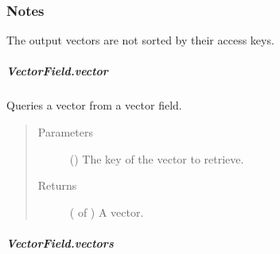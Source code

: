 \documentclass[letterpaper,10pt,english]{sphinxmanual}
\begin{document}
\begin{fulllineitems}
\begin{fulllineitems}
\begin{quote}
\begin{description}
\end{description}\end{quote}
\subsubsection*{Notes}

The output vectors are not sorted by their access keys.

\end{fulllineitems}



\subparagraph{VectorField.vector}
\label{\detokenize{api/generated/directional_clustering.fields.VectorField.vector:vectorfield-vector}}\label{\detokenize{api/generated/directional_clustering.fields.VectorField.vector::doc}}

\begin{fulllineitems}
\label{\detokenize{api/generated/directional_clustering.fields.VectorField.vector:directional_clustering.fields.VectorField.vector}}
Queries a vector from a vector field.
\begin{quote}\begin{description}
\item[{Parameters}] \leavevmode
{} () \textendash{} The key of the vector to retrieve.

\item[{Returns}] \leavevmode
{} ( of ) \textendash{} A vector.

\end{description}\end{quote}

\end{fulllineitems}



\subparagraph{VectorField.vectors}
\label{\detokenize{api/generated/directional_clustering.fields.VectorField.vectors:vectorfield-vectors}}\label{\detokenize{api/generated/directional_clustering.fields.VectorField.vectors::doc}}


\end{fulllineitems}
\end{document}
